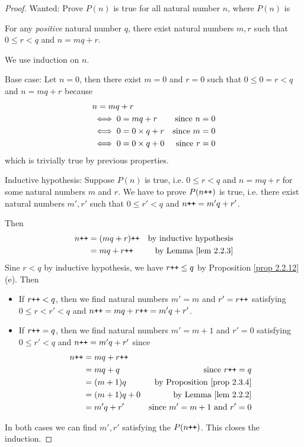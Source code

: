 \begin{proof}
Wanted: Prove \(P(n)\) is true for all natural number \(n\), where \(P(n)\) is
\begin{center}
    For any \emph{positive} natural number \(q\), there exist natural numbers \(m, r\) such that \(0 \leq r < q\) and \(n = mq + r\).
\end{center}

We use induction on \(n\).

Base case: Let \(n = 0\), then there exist \(m = 0\) and \(r = 0\) such that \(0 \leq 0 = r < q\) and \(n = mq + r\) because
\begin{align*}
    & n = mq + r \\
    & \iff 0 = mq + r & \text{since \(n = 0\)} \\
    & \iff 0 = 0 \times q + r & \text{since \(m = 0\)} \\
    & \iff 0 = 0 \times q + 0 & \text{since \(r = 0\)} \\
\end{align*}
which is trivially true by previous properties.

Inductive hypothesis: Suppose \(P(n)\) is true, i.e. \(0 \leq r < q\) and \(n = mq + r\) for some natural numbers \(m\) and \(r\). We have to prove \(P(n\texttt{++})\) is true, i.e. there exist natural numbers \(m', r'\) such that \(0 \leq r' < q\) and \(n\texttt{++} = m'q + r'\).

Then
\begin{align*}
    n\texttt{++} & = (mq + r)\texttt{++} & \text{by inductive hypothesis} \\
          & = mq + r\texttt{++}   & \text{by Lemma \ref{lem 2.2.3}}
\end{align*}
Sine \(r < q\) by inductive hypothesis, we have \(r\texttt{++} \leq q\) by Proposition \ref{prop 2.2.12}(e). Then
    \begin{itemize}
        \item If \(r\texttt{++} < q\), then we find natural numbers \(m' = m\) and \(r' = r\texttt{++}\) satisfying \(0 \leq r < r' < q\) and \(n\texttt{++} = mq + r\texttt{++} = m'q + r'\).
        \item If \(r\texttt{++} = q\), then we find natural numbers \(m' = m + 1\) and 
        \(r' = 0\) satisfying \(0 \leq r' < q\) and \(n\texttt{++} = m'q + r'\) since
        \begin{align*}
            n\texttt{++} & = mq + r\texttt{++} \\
                  & = mq + q     & \text{since \(r\texttt{++}= q\)} \\
                  & = (m + 1)q     & \text{by Proposition \ref{prop 2.3.4}} \\
                  & = (m + 1)q + 0 & \text{by Lemma \ref{lem 2.2.2}} \\
                  & = m'q + r'   & \text{since \(m' = m + 1\) and \(r' = 0\)}
        \end{align*}
    \end{itemize}
In both cases we can find \(m', r'\) satisfying the \(P(n\texttt{++})\). This closes the induction.
\end{proof}

